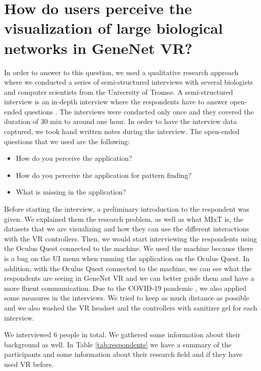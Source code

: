 \section{How do users perceive the visualization of large biological networks in GeneNet VR?}
In order to answer to this question, we used a qualitative research approach where we conducted a series of semi-structured interviews with several biologists and computer scientists from the University of Troms\o. A semi-structured interview is an in-depth interview where the respondents have to answer open-ended questions \cite{interviews}. The interviews were conducted only once and they covered the duration of 30 min to around one hour. In order to have the interview data captured, we took hand written notes during the interview. The open-ended questions that we used are the following:
\begin{itemize}
  \item How do you perceive the application?
  \item How do you perceive the application for pattern finding?
  \item What is missing in the application?
\end{itemize}

Before starting the interview, a preliminary introduction to the respondent was given. We explained them the research problem, as well as what MIxT is, the datasets that we are visualizing and how they can use the different interactions with the VR controllers. Then, we would start interviewing the respondents using the Oculus Quest connected to the machine. We used the machine because there is a bug on the UI menu when running the application on the Oculus Quest. In addition, with the Oculus Quest connected to the machine, we can see what the respondents are seeing in GeneNet VR and we can better guide them and have a more fluent communication. Due to the COVID-19 pandemic \cite{covid_19}, we also applied some measures in the interviews. We tried to keep as much distance as possible and we also washed the VR headset and the controllers with sanitizer gel for each interview.

We interviewed 6 people in total. We gathered some information about their background as well. In Table  \ref{tab:respondents} we have a summary of the participants and some information about their research field and if they have used VR before.


